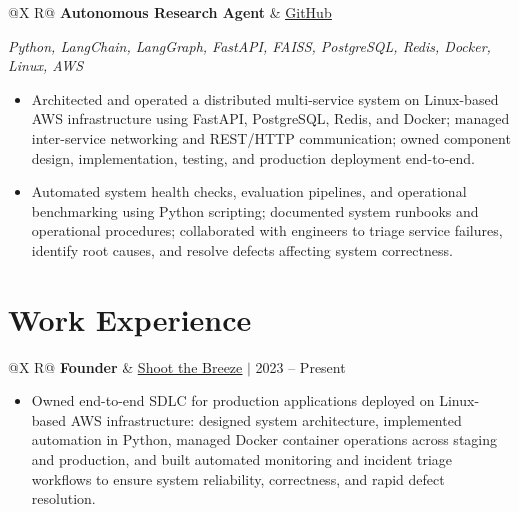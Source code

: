 \documentclass[a4paper,10pt]{article}
\newcommand{\ulink}[2]{\href{#1}{\uline{#2}}}
\newcommand{\subheading}[1]{{\color[HTML]{0A0A0A}\fontsize{12}{14}\selectfont\bfseries #1}}
\newcommand{\techstack}[1]{{\color[HTML]{5C5C5C}\fontsize{10.5}{12.5}\selectfont\itshape #1}}
\newcommand{\meta}[1]{{\color[HTML]{5C5C5C}\fontsize{10.5}{12.5}\selectfont #1}}
\begin{document}
\begin{tabularx}{\linewidth}{@{}X R@{}}
\subheading{Autonomous Research Agent} & \meta{\ulink{https://github.com/su-jin1425/Autonomous-Research-Agent}{GitHub}}
\end{tabularx}
\vspace{1pt}
\techstack{Python, LangChain, LangGraph, FastAPI, FAISS, PostgreSQL, Redis, Docker, Linux, AWS}
\begin{itemize}[nosep, leftmargin=1.5em, itemsep=1pt, topsep=2pt]
\item {\color[HTML]{0A0A0A}\fontsize{11}{14}\selectfont
Architected and operated a distributed multi-service system on Linux-based AWS infrastructure using FastAPI, PostgreSQL, Redis, and Docker; managed inter-service networking and REST/HTTP communication; owned component design, implementation, testing, and production deployment end-to-end.}
\item {\color[HTML]{0A0A0A}\fontsize{11}{14}\selectfont
Automated system health checks, evaluation pipelines, and operational benchmarking using Python scripting; documented system runbooks and operational procedures; collaborated with engineers to triage service failures, identify root causes, and resolve defects affecting system correctness.}
\end{itemize}

\vspace{2pt}

\section{Work Experience}
\vspace{2pt}

\begin{tabularx}{\linewidth}{@{}X R@{}}
\subheading{Founder} & \meta{\ulink{https://shoot-the-breeze.vercel.app}{Shoot the Breeze} $|$ 2023 -- Present}
\end{tabularx}
\begin{itemize}[nosep, leftmargin=1.5em, itemsep=1pt, topsep=2pt]
\item {\color[HTML]{0A0A0A}\fontsize{11}{14}\selectfont
Owned end-to-end SDLC for production applications deployed on Linux-based AWS infrastructure: designed system architecture, implemented automation in Python, managed Docker container operations across staging and production, and built automated monitoring and incident triage workflows to ensure system reliability, correctness, and rapid defect resolution.}
\end{itemize}
\end{document}
